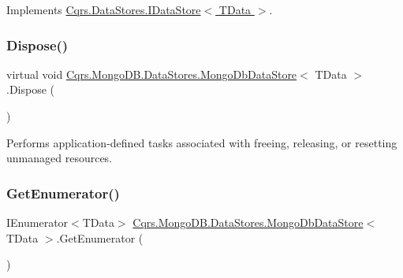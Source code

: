 Implements \hyperlink{interfaceCqrs_1_1DataStores_1_1IDataStore_aa7ade96f2f3151d5353cf7bdbb2baec5_aa7ade96f2f3151d5353cf7bdbb2baec5}{Cqrs.\+Data\+Stores.\+I\+Data\+Store$<$ T\+Data $>$}.

\mbox{\label{classCqrs_1_1MongoDB_1_1DataStores_1_1MongoDbDataStore_a5003aba35b02f686cbacf5832a14cf46_a5003aba35b02f686cbacf5832a14cf46}} 
\subsubsection{\texorpdfstring{Dispose()}{Dispose()}}
{\footnotesize\ttfamily virtual void \hyperlink{classCqrs_1_1MongoDB_1_1DataStores_1_1MongoDbDataStore}{Cqrs.\+Mongo\+D\+B.\+Data\+Stores.\+Mongo\+Db\+Data\+Store}$<$ T\+Data $>$.Dispose (\begin{DoxyParamCaption}{ }\end{DoxyParamCaption})\hspace{0.3cm}{\ttfamily [virtual]}}



Performs application-\/defined tasks associated with freeing, releasing, or resetting unmanaged resources. 

\mbox{\label{classCqrs_1_1MongoDB_1_1DataStores_1_1MongoDbDataStore_a2bab987d4d7f3c6b2ab3a3e04878cf98_a2bab987d4d7f3c6b2ab3a3e04878cf98}} 
\subsubsection{\texorpdfstring{Get\+Enumerator()}{GetEnumerator()}}
{\footnotesize\ttfamily I\+Enumerator$<$T\+Data$>$ \hyperlink{classCqrs_1_1MongoDB_1_1DataStores_1_1MongoDbDataStore}{Cqrs.\+Mongo\+D\+B.\+Data\+Stores.\+Mongo\+Db\+Data\+Store}$<$ T\+Data $>$.Get\+Enumerator (\begin{DoxyParamCaption}{ }\end{DoxyParamCaption})}



